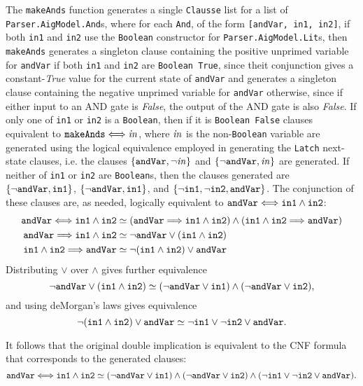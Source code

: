 \documentclass[12pt,a4paper,twoside,openright]{report}
\begin{document}
{The \verb,makeAnds, function generates a single \verb,Clausse, list for a list of \verb,Parser.AigModel.And,s,
where for each \verb,And,, of the form \verb.[andVar, in1, in2]., if both \verb,in1, and \verb,in2, use
the \verb,Boolean, constructor for \verb,Parser.AigModel.Lit,s, then \verb,makeAnds, generates a singleton
clause containing the positive unprimed variable for \verb,andVar, if both \verb,in1, and \verb,in2, are
\verb,Boolean True,, since theit conjunction gives a constant-{\it True} value for the current state of
\verb,andVar, and generates a singleton clause containing the negative unprimed variable for \verb,andVar,
otherwise, since if either input to an AND gate is {\it False}, the output of the AND gate is also {\it False}.
If only one of \verb,in1, or \verb,in2, is a \verb,Boolean,, then if it is \verb,Boolean False, clauses equivalent
to ${\tt makeAnds} \Longleftrightarrow {\it in}$, where ${\it in}$ is the non-\verb,Boolean, variable
are generated using the logical equivalence employed in generating the \verb,Latch, next-state clauses, i.e.
the clauses $\{\verb,andVar,, \neg {\it in}\}$ and $\{\neg\verb,andVar,, {\it in}\}$ are generated.
If neither of \verb,in1, or \verb,in2, are \verb,Boolean,s, then the clauses generated are
$\{\neg\verb,andVar,, \verb,in1,\}$, $\{\neg\verb,andVar,, \verb,in1,\}$, and
$\{\neg\verb,in1,,\neg\verb,in2,,\verb,andVar,\}$. The conjunction of these clauses are, as needed,
logically equivalent to $\verb,andVar, \Longleftrightarrow \verb,in1, \wedge \verb,in2,$:
\begin{align*}
{\tt andVar} \Longleftrightarrow {\tt in1} \wedge {\tt in2} &\simeq
({\tt andVar} \Longrightarrow {\tt in1} \wedge {\tt in2}) \wedge
({\tt in1} \wedge {\tt in2} \Longrightarrow {\tt andVar})\\
{\tt andVar} \Longrightarrow {\tt in1} \wedge {\tt in2} &\simeq
\neg {\tt andVar} \vee ({\tt in1} \wedge {\tt in2})\\
{\tt in1} \wedge {\tt in2} \Longrightarrow {\tt andVar} &\simeq
\neg ({\tt in1} \wedge {\tt in2}) \vee {\tt andVar}
\end{align*}
Distributing $\vee$ over $\wedge$ gives further equivalence
$$\neg {\tt andVar} \vee ({\tt in1} \wedge {\tt in2}) \simeq
(\neg {\tt andVar} \vee {\tt in1}) \wedge (\neg {\tt andVar} \vee {\tt in2}),$$
and using deMorgan's laws gives equivalence
$$\neg ({\tt in1} \wedge {\tt in2}) \vee {\tt andVar} \simeq
\neg {\tt in1} \vee \neg {\tt in2} \vee {\tt andVar}.$$

It follows that the original double implication is equivalent to the CNF
formula that corresponds to the generated clauses:
$$ {\tt andVar} \Longleftrightarrow {\tt in1} \wedge {\tt in2} \simeq
(\neg {\tt andVar} \vee {\tt in1}) \wedge (\neg {\tt andVar} \vee {\tt in2}) \wedge
(\neg {\tt in1} \vee \neg {\tt in2} \vee {\tt andVar}).$$


}
\end{document}
